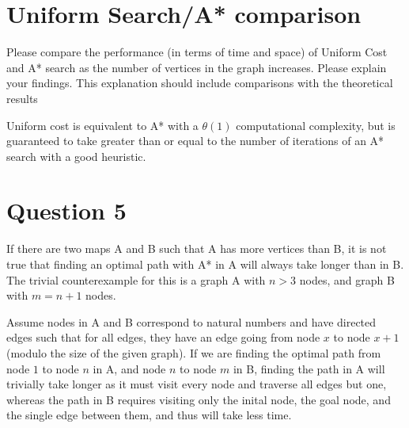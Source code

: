 \documentclass[11pt,a4paper]{article}
\begin{document}
\section{Uniform Search/A* comparison}

Please compare the performance (in terms of time and space) of Uniform Cost and A* search as the number of vertices in the graph increases. Please explain your findings. This explanation should include comparisons with the theoretical results

Uniform cost is equivalent to A* with a \(\theta(1)\) computational complexity, but is guaranteed to take greater than or equal to the number of iterations of an A* search with a good heuristic.



\section{Question 5}
If there are two maps A and B such that A has more vertices than B, it is not true that finding an optimal path with A* in A will always take longer than in B. The trivial counterexample for this is a graph A with \(n > 3\) nodes, and graph B with \(m = n + 1\) nodes.

Assume nodes in A and B correspond to natural numbers and have directed edges such that for all edges, they have an edge going from node \(x\) to node \(x+1\) (modulo the size of the given graph). If we are finding the optimal path from node \(1\) to node \(n\) in A, and node \(n\) to node \(m\) in B, finding the path in A will trivially take longer as it must visit every node and traverse all edges but one, whereas the path in B requires visiting only the inital node, the goal node, and the single edge between them, and thus will take less time.
\end{document}

